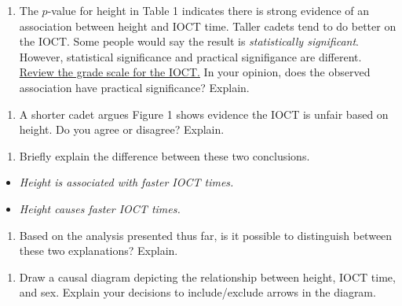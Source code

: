\documentclass[]{book}
\providecommand{\tightlist}{%
  \setlength{\itemsep}{0pt}\setlength{\parskip}{0pt}}
\begin{document}
\begin{enumerate}
\def\labelenumi{\arabic{enumi}.}
\setcounter{enumi}{6}
\tightlist
\item
  The \(p\)-value for height in Table 1 indicates there is strong evidence of an association between height and IOCT time. Taller cadets tend to do better on the IOCT. Some people would say the result is \emph{statistically significant}. However, statistical significance and practical signifigance are different. \href{https://en.wikipedia.org/wiki/Indoor_Obstacle_Course_Test}{Review the grade scale for the IOCT.} In your opinion, does the observed association have practical significance? Explain.
\end{enumerate}

\vspace{1in}

\begin{enumerate}
\def\labelenumi{\arabic{enumi}.}
\setcounter{enumi}{7}
\tightlist
\item
  A shorter cadet argues Figure 1 shows evidence the IOCT is unfair based on height. Do you agree or disagree? Explain.
\end{enumerate}

\vspace{1in}

\begin{enumerate}
\def\labelenumi{\arabic{enumi}.}
\setcounter{enumi}{8}
\tightlist
\item
  Briefly explain the difference between these two conclusions.
\end{enumerate}

\begin{itemize}
\item
  \emph{Height is associated with faster IOCT times.}
\item
  \emph{Height causes faster IOCT times.}
\end{itemize}

\vspace{1in}

\begin{enumerate}
\def\labelenumi{\arabic{enumi}.}
\setcounter{enumi}{9}
\tightlist
\item
  Based on the analysis presented thus far, is it possible to distinguish between these two explanations? Explain.
\end{enumerate}

\vspace{1in}

\begin{enumerate}
\def\labelenumi{\arabic{enumi}.}
\setcounter{enumi}{10}
\tightlist
\item
  Draw a causal diagram depicting the relationship between height, IOCT time, and sex. Explain your decisions to include/exclude arrows in the diagram.
\end{enumerate}
\end{document}
